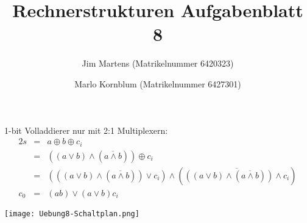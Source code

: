 \documentclass[10pt,a4paper,oneside,ngerman,numbers=noenddot]{scrartcl}
\begin{document}
\author{Jim Martens (Matrikelnummer 6420323) \and Marlo Kornblum (Matrikelnummer 6427301)}
\title{Rechnerstrukturen Aufgabenblatt 8}
\maketitle

\section{} %
1-bit Volladdierer nur mit 2:1 Multiplexern:\\
\begin{alignat*}{2}
	s &=& a \oplus b \oplus c_{i} \\
	  &=& ((a \vee b) \wedge (\overline{a \wedge b})) \oplus c_{i} \\
	  &=& (((a \vee b) \wedge (\overline{a \wedge b})) \vee c_{i}) \wedge (\overline{((a \vee b) \wedge (\overline{a \wedge b})) \wedge c_{i}}) \\
	c_{0} &=& (ab) \vee (a \vee b)c_{i}
\end{alignat*}

\texttt{[image: Uebung8-Schaltplan.png]}
\section{} %
\end{document}
